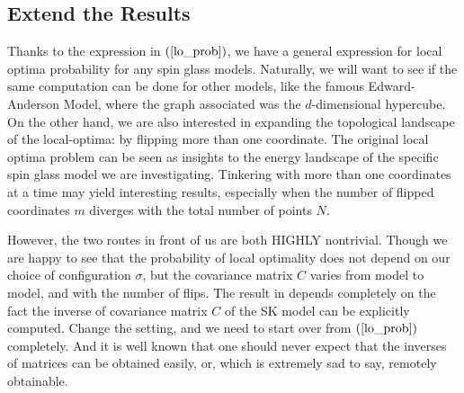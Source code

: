 \documentclass[10pt]{article}
\newcommand{\gy}[1]{\textbf{\color{red}[Yi: #1]}}
\newenvironment{Proof of lemma}{\noindent{\bf Proof of Lemma}}{\hfill$\Box$\newline}
\newenvironment{Proof of claim}{\noindent{\bf Proof of claim}}{\hfill$\Box$\newline}
\newenvironment{Proof of theorem}{\noindent{\bf Proof of Theorem}}{\hfill\scriptsize{$\Box$}\newline}
\newenvironment{Proof of theorems}{\noindent{\bf Proof of Theorems}}{\hfill$\Box$\newline}
\newenvironment{Proof of proposition}{\noindent{\bf Proof of Proposition}}{\hfill$\Box$\newline}
\newenvironment{Proof of propositions}{\noindent{\bf Proof of Propositions}}{\hfill$\Box$\newline}
\newenvironment{Proof of exercise}{\noindent{\it Proof of Exercise:}}{\hfill$\Box$}
\numberwithin{equation}{section}
\begin{document}
\subsection{Extend the Results}
Thanks to the expression in $(\ref{lo_prob})$, we have a general expression for local optima probability for any spin glass models. Naturally, we will want to see if the same computation can be done for other models, like the famous Edward-Anderson Model, where the graph associated was the $d$-dimensional hypercube. On the other hand, we are also interested in expanding the topological landscape of the local-optima: by flipping more than one coordinate. The original local optima problem can be seen as insights to the energy landscape of the specific spin glass model we are investigating. Tinkering with more than one coordinates at a time may yield interesting results, especially when the number of flipped coordinates $m$ diverges with the total number of points $N$.

However, the two routes in front of us are both HIGHLY nontrivial. Though we are happy to see that the probability of local optimality does not depend on our choice of configuration $\sigma$, but the covariance matrix $C$ varies from model to model, and with the number of flips. The result in \cite{SK_optimal} depends completely on the fact the inverse of covariance matrix $C$ of the SK model can be explicitly computed. Change the setting, and we need to start over from $(\ref{lo_prob})$ completely. And it is well known that one should never expect that the inverses of matrices can be obtained easily, or, which is extremely sad to say, remotely obtainable.
\end{document}
